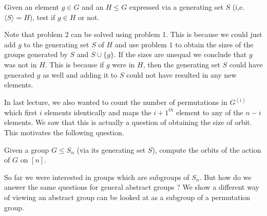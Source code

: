 \begin{problem}
	Given an element  $g \in G$ and an $H \le G$ expressed via a
	generating set $S$ (i,e. $\langle S \rangle = H$), test if $g \in H$
	or not.
\end{problem}

Note that problem 2 can be solved using problem 1. This is because we could
just add $g$ to the generating set $S$ of $H$ and use problem $1$ to obtain
the sizes of the groups generated by $S$ and $S \cup \{g\}$. If the sizes are
unequal we conclude that $g$ was not in $H$. This is because if $g$ were in
$H$, then the generating set $S$ could have generated $g$ as well and adding
it to $S$ could not have resulted in any new elements.  

In last lecture, we also wanted to count the number of permutations in 
$G^{(i)}$ which first $i$ elements identically and maps the $i+1^{th}$ element
to any of the $n-i$ elements. We saw that this is actually a question of
obtaining the size of orbit. This motivates the following question.

\begin{problem} 
	Given a group $G \le S_{n}$ (via its generating set $S$), compute the
	orbits of the action of $G$ on $[n]$.
\end{problem}

So far we were interested in groups which are subgroups of $S_n$. But how do
we answer the same questions for general abstract groups ? We show a different
way of viewing an abstract group can be looked at as a subgroup of a 
permutation group. 

